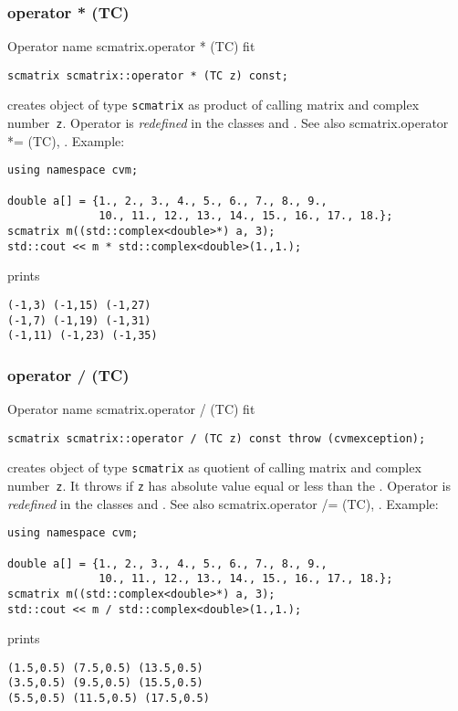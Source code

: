 \subsubsection{operator * (TC)}
Operator%
\pdfdest name {scmatrix.operator * (TC)} fit
\begin{verbatim}
scmatrix scmatrix::operator * (TC z) const;
\end{verbatim}
creates  object of type \verb"scmatrix" as  product of
 calling matrix and  complex number~\verb"z".
Operator is \emph{redefined} in the classes
and .
See also 
{scmatrix.operator *= (TC)},
.
Example:
\begin{Verbatim}
using namespace cvm;

double a[] = {1., 2., 3., 4., 5., 6., 7., 8., 9.,
              10., 11., 12., 13., 14., 15., 16., 17., 18.};
scmatrix m((std::complex<double>*) a, 3);
std::cout << m * std::complex<double>(1.,1.);
\end{Verbatim}
prints
\begin{Verbatim}
(-1,3) (-1,15) (-1,27)
(-1,7) (-1,19) (-1,31)
(-1,11) (-1,23) (-1,35)
\end{Verbatim}
\newpage



\subsubsection{operator / (TC)}
Operator%
\pdfdest name {scmatrix.operator / (TC)} fit
\begin{verbatim}
scmatrix scmatrix::operator / (TC z) const throw (cvmexception);
\end{verbatim}
creates  object of type \verb"scmatrix" as  quotient of
 calling matrix and  complex number~\verb"z". 
It throws
if \verb"z" has  absolute value equal or less than the
.
Operator is \emph{redefined} in the classes
and .
See also 
{scmatrix.operator /= (TC)},
.
Example:
\begin{Verbatim}
using namespace cvm;

double a[] = {1., 2., 3., 4., 5., 6., 7., 8., 9.,
              10., 11., 12., 13., 14., 15., 16., 17., 18.};
scmatrix m((std::complex<double>*) a, 3);
std::cout << m / std::complex<double>(1.,1.);
\end{Verbatim}
prints
\begin{Verbatim}
(1.5,0.5) (7.5,0.5) (13.5,0.5)
(3.5,0.5) (9.5,0.5) (15.5,0.5)
(5.5,0.5) (11.5,0.5) (17.5,0.5)
\end{Verbatim}
\newpage



